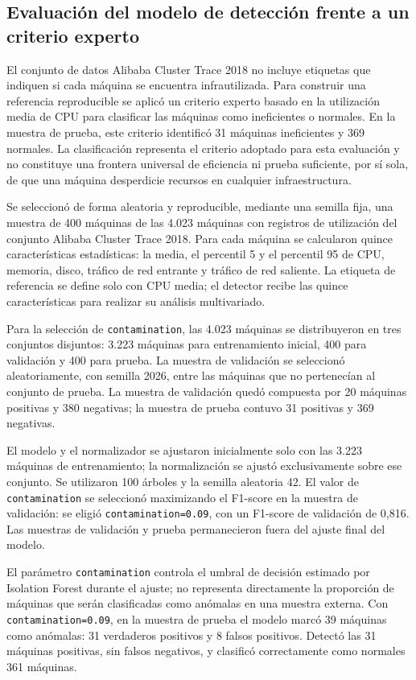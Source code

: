 \subsection{Evaluación del modelo de detección frente a un criterio experto}

El conjunto de datos Alibaba Cluster Trace 2018 no incluye etiquetas que indiquen si cada máquina se encuentra infrautilizada. Para construir una referencia reproducible se aplicó un criterio experto basado en la utilización media de CPU para clasificar las máquinas como ineficientes o normales. En la muestra de prueba, este criterio identificó 31 máquinas ineficientes y 369 normales. La clasificación representa el criterio adoptado para esta evaluación y no constituye una frontera universal de eficiencia ni prueba suficiente, por sí sola, de que una máquina desperdicie recursos en cualquier infraestructura.

Se seleccionó de forma aleatoria y reproducible, mediante una semilla fija, una muestra de 400 máquinas de las 4.023 máquinas con registros de utilización del conjunto Alibaba Cluster Trace 2018. Para cada máquina se calcularon quince características estadísticas: la media, el percentil 5 y el percentil 95 de CPU, memoria, disco, tráfico de red entrante y tráfico de red saliente. La etiqueta de referencia se define solo con CPU media; el detector recibe las quince características para realizar su análisis multivariado.

Para la selección de \texttt{contamination}, las 4.023 máquinas se distribuyeron en tres conjuntos disjuntos: 3.223 máquinas para entrenamiento inicial, 400 para validación y 400 para prueba. La muestra de validación se seleccionó aleatoriamente, con semilla 2026, entre las máquinas que no pertenecían al conjunto de prueba. La muestra de validación quedó compuesta por 20 máquinas positivas y 380 negativas; la muestra de prueba contuvo 31 positivas y 369 negativas.

El modelo y el normalizador se ajustaron inicialmente solo con las 3.223 máquinas de entrenamiento; la normalización se ajustó exclusivamente sobre ese conjunto. Se utilizaron 100 árboles y la semilla aleatoria 42. El valor de \texttt{contamination} se seleccionó maximizando el F1-score en la muestra de validación: se eligió \texttt{contamination=0.09}, con un F1-score de validación de 0,816. Las muestras de validación y prueba permanecieron fuera del ajuste final del modelo.

El parámetro \texttt{contamination} controla el umbral de decisión estimado por Isolation Forest durante el ajuste; no representa directamente la proporción de máquinas que serán clasificadas como anómalas en una muestra externa. Con \texttt{contamination=0.09}, en la muestra de prueba el modelo marcó 39 máquinas como anómalas: 31 verdaderos positivos y 8 falsos positivos. Detectó las 31 máquinas positivas, sin falsos negativos, y clasificó correctamente como normales 361 máquinas.


